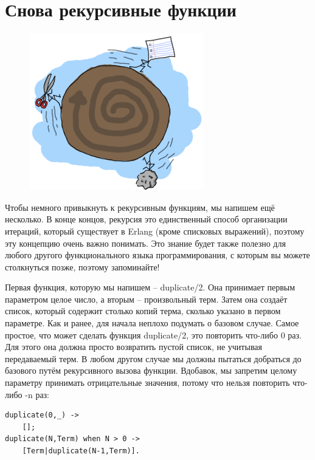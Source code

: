 \documentclass[a4paper,12pt]{report}
\newcommand{\ops}{\colorbox{lgreen}}
\begin{document}
\section{Снова рекурсивные функции}
\begin{figure}
    \includegraphics[width=1\linewidth]{rock-paper-scissors.png}
\end{figure}
Чтобы немного привыкнуть к рекурсивным функциям, мы напишем ещё несколько. В конце концов, рекурсия это единственный способ организации итераций, который существует в Erlang (кроме списковых выражений), поэтому эту концепцию очень важно понимать. Это знание будет также полезно для любого другого функционального языка программирования, с которым вы можете столкнуться позже, поэтому запоминайте!

Первая функция, которую мы напишем \--- \ops{duplicate/2}. Она принимает первым параметром целое число, а вторым \--- произвольный терм. Затем она создаёт список, который содержит столько копий терма, сколько указано в первом параметре. Как и ранее, для начала неплохо подумать о базовом случае. Самое простое, что может сделать функция \ops{duplicate/2}, это повторить что\--либо 0 раз. Для этого она должна просто возвратить пустой список, не учитывая передаваемый терм. В любом другом случае мы должны пытаться добраться до базового путём рекурсивного вызова функции. Вдобавок, мы запретим целому параметру принимать отрицательные значения, потому что нельзя повторить что\--либо \ops{-n} раз:
\begin{lstlisting}[style=erlang]
duplicate(0,_) ->
    [];
duplicate(N,Term) when N > 0 ->
    [Term|duplicate(N-1,Term)].
\end{lstlisting}
\end{document}
